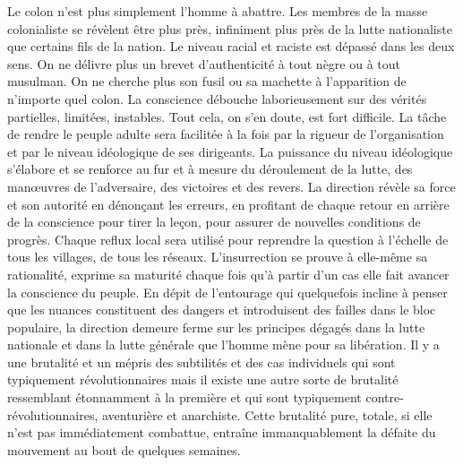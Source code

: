\documentclass[french,twoside]{book} %
\begin{document}
Le colon n’est plus simplement l’homme à abattre. Les membres de la masse colonialiste se révèlent être plus près, infiniment plus près de la lutte nationaliste que certains fils de la   nation. Le niveau racial et raciste est dépassé dans les deux sens. On ne délivre plus un brevet d’authenticité à tout nègre ou à tout musulman. On ne cherche plus son fusil ou sa machette à l’apparition de n’importe quel colon. La conscience débouche laborieusement sur des vérités partielles, limitées, instables. Tout cela, on s’en doute, est fort difficile. La tâche de rendre le peuple adulte sera facilitée à la fois par la rigueur de l’organisation et par le niveau idéologique de ses dirigeants. La puissance du niveau idéologique s’élabore et se renforce au fur et à mesure du déroulement de la lutte, des manœuvres de l’adversaire, des victoires et des revers. La direction révèle sa force et son autorité en dénonçant les erreurs, en profitant de chaque retour en arrière de la conscience pour tirer la leçon, pour assurer de nouvelles conditions de progrès. Chaque reflux local sera utilisé pour reprendre la question à l’échelle de tous les villages, de tous les réseaux. L’insurrection se prouve à elle-même sa rationalité, exprime sa maturité chaque fois qu’à partir d’un cas elle fait avancer la conscience du peuple. En dépit de l’entourage qui quelquefois incline à penser que les nuances constituent des dangers et introduisent des failles dans le bloc populaire, la direction demeure ferme sur les principes dégagés dans la lutte nationale et dans la lutte générale que l’homme mène pour sa libération. Il y a une brutalité et un mépris des subtilités et des cas individuels qui sont typiquement révolutionnaires mais il existe une autre sorte de brutalité ressemblant étonnamment à la première et qui sont typiquement contre-révolutionnaires, aventurière et anarchiste. Cette brutalité pure, totale, si elle n’est pas immédiatement combattue, entraîne immanquablement la défaite du mouvement au bout de quelques semaines.\par
\bigbreak
\end{document}
